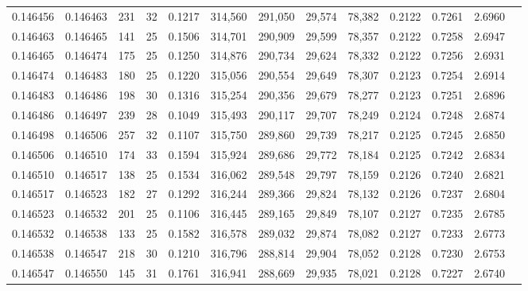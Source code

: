 \begin{tabular}{rrrrrrrrrrrrr}
0.146456 & 0.146463 & 231 &  32 &                                     0.1217 & 314,560 & 291,050 &  29,574 &  78,382 & 0.2122 & 0.7261 & 2.6960 \\
0.146463 & 0.146465 & 141 &  25 &                                     0.1506 & 314,701 & 290,909 &  29,599 &  78,357 & 0.2122 & 0.7258 & 2.6947 \\
0.146465 & 0.146474 & 175 &  25 &                                     0.1250 & 314,876 & 290,734 &  29,624 &  78,332 & 0.2122 & 0.7256 & 2.6931 \\
0.146474 & 0.146483 & 180 &  25 &                                     0.1220 & 315,056 & 290,554 &  29,649 &  78,307 & 0.2123 & 0.7254 & 2.6914 \\
0.146483 & 0.146486 & 198 &  30 &                                     0.1316 & 315,254 & 290,356 &  29,679 &  78,277 & 0.2123 & 0.7251 & 2.6896 \\
0.146486 & 0.146497 & 239 &  28 &                                     0.1049 & 315,493 & 290,117 &  29,707 &  78,249 & 0.2124 & 0.7248 & 2.6874 \\
0.146498 & 0.146506 & 257 &  32 &                                     0.1107 & 315,750 & 289,860 &  29,739 &  78,217 & 0.2125 & 0.7245 & 2.6850 \\
0.146506 & 0.146510 & 174 &  33 &                                     0.1594 & 315,924 & 289,686 &  29,772 &  78,184 & 0.2125 & 0.7242 & 2.6834 \\
0.146510 & 0.146517 & 138 &  25 &                                     0.1534 & 316,062 & 289,548 &  29,797 &  78,159 & 0.2126 & 0.7240 & 2.6821 \\
0.146517 & 0.146523 & 182 &  27 &                                     0.1292 & 316,244 & 289,366 &  29,824 &  78,132 & 0.2126 & 0.7237 & 2.6804 \\
0.146523 & 0.146532 & 201 &  25 &                                     0.1106 & 316,445 & 289,165 &  29,849 &  78,107 & 0.2127 & 0.7235 & 2.6785 \\
0.146532 & 0.146538 & 133 &  25 &                                     0.1582 & 316,578 & 289,032 &  29,874 &  78,082 & 0.2127 & 0.7233 & 2.6773 \\
0.146538 & 0.146547 & 218 &  30 &                                     0.1210 & 316,796 & 288,814 &  29,904 &  78,052 & 0.2128 & 0.7230 & 2.6753 \\
0.146547 & 0.146550 & 145 &  31 &                                     0.1761 & 316,941 & 288,669 &  29,935 &  78,021 & 0.2128 & 0.7227 & 2.6740 \\

\end{tabular}
